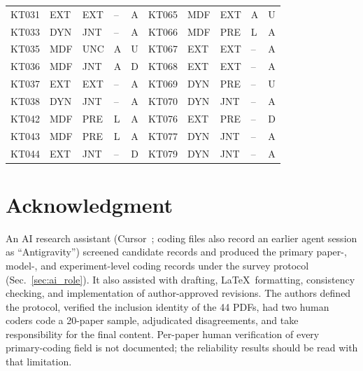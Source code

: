 \documentclass[lettersize,journal]{IEEEtran}
\begin{document}
\begin{table}[t]
\begin{tabular}{@{}lllll@{\hspace{1.4em}}lllll@{}}
KT031 & EXT & EXT & -- & A & KT065 & MDF & EXT & A & U \\
KT033 & DYN & JNT & -- & A & KT066 & MDF & PRE & L & A \\
KT035 & MDF & UNC & A & U & KT067 & EXT & EXT & -- & A \\
KT036 & MDF & JNT & A & D & KT068 & EXT & EXT & -- & A \\
KT037 & EXT & EXT & -- & A & KT069 & DYN & PRE & -- & U \\
KT038 & DYN & JNT & -- & A & KT070 & DYN & JNT & -- & A \\
KT042 & MDF & PRE & L & A & KT076 & EXT & PRE & -- & D \\
KT043 & MDF & PRE & L & A & KT077 & DYN & JNT & -- & A \\
KT044 & EXT & JNT & -- & D & KT079 & DYN & JNT & -- & A \\
\bottomrule
\end{tabular}
\end{table}

\section*{Acknowledgment}
An AI research assistant (Cursor~\cite{Cursor_AI_2026}; coding files also record an earlier agent session as ``Antigravity'') screened candidate records and produced the primary paper-, model-, and experiment-level coding records under the survey protocol (Sec.~\ref{sec:ai_role}). It also assisted with drafting, \LaTeX\ formatting, consistency checking, and implementation of author-approved revisions. The authors defined the protocol, verified the inclusion identity of the 44 PDFs, had two human coders code a 20-paper sample, adjudicated disagreements, and take responsibility for the final content. Per-paper human verification of every primary-coding field is not documented; the reliability results should be read with that limitation.


\end{document}
